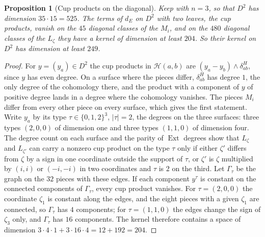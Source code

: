 \documentclass[11pt,reqno]{amsart}
\theoremstyle{plain}
\newtheorem{proposition}[theorem]{Proposition}
\theoremstyle{definition}
\theoremstyle{remark}
\newcommand{\cH}{\mathcal{H}}
\DeclareMathOperator{\Ext}{Ext}
\begin{document}
\begin{proposition}[Cup products on the diagonal]\label{prop:cupkernel}
Keep  with $n=3$, so that $D^{2}$ has dimension
$35\cdot15=525$. The terms of $d_{E}$ on $D^{2}$ with two leaves, the cup
products, vanish on the $45$ diagonal classes of the $M_{i}$, and on the
$480$ diagonal classes of the $L_{\zeta}$ they have a kernel of dimension at
least $204$. So their kernel on $D^{2}$ has dimension at least $249$.
\end{proposition}

\begin{proof}
For $y=(y_{a})\in D^{2}$ the cup products in $\cH(a,b)$ are
$(y_{a}-y_{b})\wedge\delta^{H}_{ab}$, since $y$ has even degree. On a surface
where the pieces differ, $\delta^{H}_{ab}$ has degree $1$, the only degree of
the cohomology there, and the product with a component of $y$ of positive
degree lands in a degree where the cohomology vanishes. The pieces $M_{i}$
differ from every other piece on every surface, which gives the first
statement. Write $y_{a}$ by its type $\tau\in\{0,1,2\}^{3}$, $|\tau|=2$, the
degrees on the three surfaces: three types $(2,0,0)$ of dimension one and
three types $(1,1,0)$ of dimension four. The degree count on each surface
and the parity of $\Ext$ degrees show that $L_{\zeta}$ and $L_{\zeta'}$ can
carry a nonzero cup product on the type $\tau$ only if either $\zeta'$
differs from $\zeta$ by a sign in one coordinate outside the support of
$\tau$, or $\zeta'$ is $\zeta$ multiplied by $(i,i)$ or $(-i,-i)$ in two
coordinates and $\tau$ is $2$ on the third. Let $\Gamma_{\tau}$ be the graph
on the $32$ pieces with these edges. If each component $y^{\tau}$ is
constant on the connected components of $\Gamma_{\tau}$, every cup product
vanishes. For $\tau=(2,0,0)$ the coordinate $\zeta_{1}$ is constant along
the edges, and the eight pieces with a given $\zeta_{1}$ are connected, so
$\Gamma_{\tau}$ has $4$ components; for $\tau=(1,1,0)$ the edges change the
sign of $\zeta_{3}$ only, and $\Gamma_{\tau}$ has $16$ components. The
kernel therefore contains a space of dimension $3\cdot4\cdot1+3\cdot16\cdot4
=12+192=204$.
\end{proof}
\end{document}
